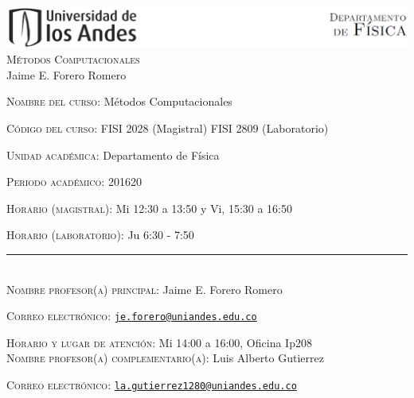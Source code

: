 \documentclass[letterpaper,10pt,onecolumn]{article}
\begin{document}
\begin{center}

\includegraphics[width=490pt]{header.png}\\[0.5cm]

\textsc{\LARGE M\'etodos Computacionales}\\[0.1cm]
\large Jaime E. Forero Romero\\[0.5cm]

\end{center}

\large \noindent\textsc{Nombre del curso:}  M\'etodos Computacionales%
  
\noindent\textsc{C\'odigo del curso:} FISI 2028 (Magistral) FISI 2809 (Laboratorio) %

\noindent\textsc{Unidad acad\'emica:} Departamento de F\'isica

\noindent\textsc{Periodo acad\'emico:} 201620 %

\noindent\textsc{Horario (magistral):} Mi 12:30 a 13:50 y Vi, 15:30 a
16:50 %

\noindent\textsc{Horario (laboratorio):} Ju 6:30 - 7:50

\noindent\rule{\textwidth}{1pt}\\[-0.3cm]

\normalsize \noindent\textsc{Nombre profesor(a) principal:} Jaime
E. Forero Romero%

\noindent\textsc{Correo electr\'onico:}
\href{mailto:je.forero@uniandes.edu.co}{\nolinkurl{je.forero@uniandes.edu.co}}

\noindent\textsc{Horario y lugar de atenci\'on:} Mi 14:00 a 16:00, Oficina Ip208 
\\[-0.1cm]

\noindent\textsc{Nombre profesor(a) complementario(a):} Luis Alberto
Gutierrez %

\noindent\textsc{Correo electr\'onico:}
\href{mailto: la.gutierrez1280@uniandes.edu.co}{\nolinkurl{la.gutierrez1280@uniandes.edu.co}}
\end{document}
